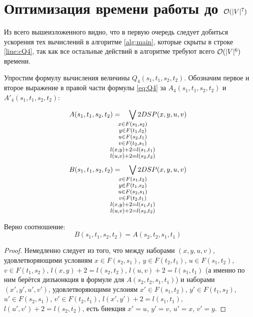 \chapter{Оптимизация времени работы до $\mathcal{O}(|V|^7)$}

Из всего вышеизложенного видно, что в первую очередь следует добиться ускорения тех вычислений в алгоритме \ref{alg:main}, которые скрыты в строке \ref{line:cQ4}, так как все остальные действий в алгоритме требуют всего $\mathcal{O}(|V|^6)$ времени.

Упростим формулу вычисления величины $Q_4(s_1, t_1, s_2, t_2)$. Обозначим первое и второе выражение в правой части формулы \eqref{eq:Q4} за $A_4(s_1, t_1, s_2, t_2)$ и $A'_4(s_1, t_1, s_2, t_2)$:

\begin{equation} \label{eq:A} 
    A(s_1, t_1, s_2, t_2) = \quad
        \smashoperator{\bigvee_{
        \large \substack{
            x \in F(s_1, s_2)\\ 
            y \in F(t_1, t_2)\\ 
            u \in F(s_2, t_1)\\ 
            v \in F(t_2, s_1)\\ 
            l(x, y) + 2 = l(s_1, t_1)\\ 
            l(u, v) + 2 = l(s_2, t_2)
        }
        }} 2DSP(x, y, u, v)
\end{equation}
\begin{equation} \label{eq:B}
   B(s_1, t_1, s_2, t_2) = \quad
        \smashoperator{\bigvee_{
        \large \substack{
            x \in F(s_1, t_2)\\ 
            y \in F(t_1, s_2)\\ 
            u \in F(s_2, s_1)\\ 
            v \in F(t_2, t_1)\\ 
            l(x, y) + 2 = l(s_1, t_1)\\ 
            l(u, v) + 2 = l(s_2, t_2)
        }
        }} 2DSP(x, y, u, v)
\end{equation}
\begin{proposition}
Верно соотношение:
\begin{equation}
    B(s_1, t_1, s_2, t_2) = A(s_2, t_2, s_1, t_1)
\end{equation}
\end{proposition}
\begin{proof}
Немедленно следует из того, что между наборами $(x, y, u, v)$, удовлетворяющими условиям $x \in F(s_2, s_1)$, $y \in F(t_2, t_1)$, $u \in F(s_1, t_2)$, $v \in F(t_1, s_2)$, $l(x, y) + 2 = l(s_2, t_2)$, $l(u, v) + 2 = l(s_1, t_1)$ (а именно по ним берётся дизъюнкция в формуле для $A(s_2, t_2, s_1, t_1)$) и наборами $(x', y', u', v')$, удовлетворяющими услоиям $x' \in F(s_1, t_2)$, $y' \in F(t_1, s_2)$, $u' \in F(s_2, s_1)$, $v' \in F(t_2, t_1)$, $l(x', y') + 2 = l(s_1, t_1)$, $l(u', v') + 2 = l(s_2, t_2)$, есть биекция $x' = u$, $y' = v$, $u' = x$, $v' = y$.
\end{proof}


